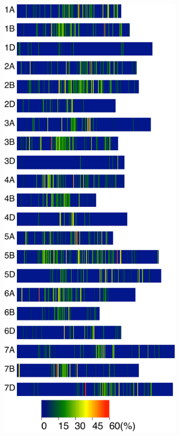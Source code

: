\begin{figure}
	\centering
	\begin{subfigure}{0.4\textwidth}
	\caption{}
	\label{fig:yr15:bfr0}
	\includegraphics[height=0.55\textheight]{Yr15/Figures/mapping/snpsBFR0.pdf}

\end{subfigure}
\end{figure}
